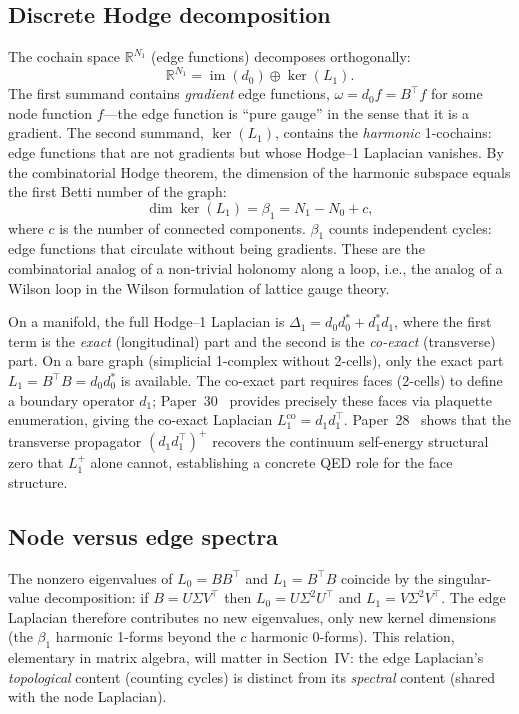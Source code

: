 \documentclass[aps,pra,twocolumn,superscriptaddress,longbibliography]{revtex4-2}
\begin{document}
\subsection{Discrete Hodge decomposition}

The cochain space $\mathbb{R}^{N_1}$ (edge functions) decomposes
orthogonally:
\begin{equation}
\mathbb{R}^{N_1} = \operatorname{im}(d_0) \oplus \ker(L_1).
\label{eq:hodge_decomp}
\end{equation}
The first summand contains \emph{gradient} edge functions,
$\omega = d_0 f = B^{\top} f$ for some node function $f$---the edge
function is ``pure gauge'' in the sense that it is a gradient.  The
second summand, $\ker(L_1)$, contains the \emph{harmonic} 1-cochains:
edge functions that are not gradients but whose Hodge--1 Laplacian
vanishes.  By the combinatorial Hodge theorem, the dimension of the
harmonic subspace equals the first Betti number of the graph:
\begin{equation}
\dim \ker(L_1) = \beta_1 = N_1 - N_0 + c,
\label{eq:betti1}
\end{equation}
where $c$ is the number of connected components.  $\beta_1$ counts
independent cycles: edge functions that circulate without being
gradients.  These are the combinatorial analog of a non-trivial
holonomy along a loop, i.e., the analog of a Wilson loop in the
Wilson formulation of lattice gauge theory.

On a manifold, the full Hodge--1 Laplacian is
$\Delta_1 = d_0 d_0^* + d_1^* d_1$, where the first term is the
\emph{exact} (longitudinal) part and the second is the
\emph{co-exact} (transverse) part.  On a bare graph (simplicial
1-complex without 2-cells), only the exact part
$L_1 = B^\top B = d_0 d_0^*$ is available.  The co-exact part requires
faces (2-cells) to define a boundary operator $d_1$;
Paper~30~\cite{paper30} provides precisely these faces via plaquette
enumeration, giving the co-exact Laplacian
$L_1^{\mathrm{co}} = d_1 d_1^\top$.  Paper~28~\cite{paper28} shows
that the transverse propagator $(d_1 d_1^\top)^+$ recovers the
continuum self-energy structural zero that $L_1^+$ alone cannot,
establishing a concrete QED role for the face structure.

\subsection{Node versus edge spectra}

The nonzero eigenvalues of $L_0 = B B^{\top}$ and $L_1 = B^{\top} B$
coincide by the singular-value decomposition: if $B = U \Sigma V^{\top}$
then $L_0 = U \Sigma^2 U^{\top}$ and $L_1 = V \Sigma^2 V^{\top}$.
The edge Laplacian therefore contributes no new eigenvalues, only new
kernel dimensions (the $\beta_1$ harmonic 1-forms beyond the
$c$ harmonic 0-forms).  This relation, elementary in matrix algebra,
will matter in Section~IV: the edge Laplacian's \emph{topological}
content (counting cycles) is distinct from its \emph{spectral}
content (shared with the node Laplacian).
\end{document}
